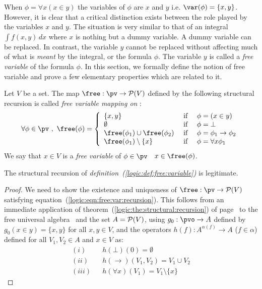 When $\phi=\forall x(x\in y)$ the variables of $\phi$ are $x$ and
$y$ i.e. $\var(\phi)=\{x,y\}$. However, it is clear that a critical
distinction exists between the role played by the variables $x$ and
$y$. The situation is very similar to that of an integral $\int\!
f(x,y)\,dx$ where $x$ is nothing but a dummy variable. A dummy
variable can be replaced. In contrast, the variable $y$ cannot be
replaced without affecting much of what is {\em meant} by the
integral, or the formula $\phi$. The variable $y$ is called a {\em
free variable} of the formula $\phi$. In this section, we formally
define the notion of free variable and prove a few elementary
properties which are related to it.

\begin{defin}\label{logic:def:free:variable}
Let $V$ be a set. The map $\free:\pv\to {\cal P}(V)$ defined by the
following structural recursion is called {\em free variable mapping
on \pv}:
 \begin{equation}\label{logic:eqn:free:var:recursion}
    \forall\phi\in\pv\ ,\ \free(\phi)=\left\{
                    \begin{array}{lcl}
                    \{x,y\}&\mbox{\ if\ }&\phi=(x\in y)\\
                    \emptyset&\mbox{\ if\ }&\phi=\bot\\
                    \free(\phi_{1})\cup\free(\phi_{2}) &\mbox{\ if\ }&\phi=\phi_{1}\to\phi_{2}\\
                    \free(\phi_{1})\setminus\{x\}&\mbox{\ if\ }&\phi=\forall x\phi_{1}
                    \end{array}\right.
    \end{equation}
We say that $x\in V$ is a {\em free variable} of $\phi\in\pv$ \ifand\ $x\in\free(\phi)$.
\end{defin}
\begin{prop}\label{logic:prop:free:variable}
The structural recursion of {\em
definition~(\ref{logic:def:free:variable})} is legitimate.
\end{prop}
\begin{proof}
We need to show the existence and uniqueness of $\free:\pv\to{\cal
P}(V)$ satisfying equation~(\ref{logic:eqn:free:var:recursion}).
This follows from an immediate application of
theorem~(\ref{logic:the:structural:recursion}) of
page~\pageref{logic:the:structural:recursion} to the free universal
algebra \pv\ and the set $A={\cal P}(V)$, using $g_{0}:\pvo\to A$
defined by $g_{0}(x\in y)=\{x,y\}$ for all $x,y\in V$, and the
operators $h(f):A^{\alpha(f)}\to A$ ($f\in\alpha$) defined for all
$V_{1},V_{2}\in A$ and $x\in V$ as:
    \begin{eqnarray*}
    (i)&&h(\bot)(0)=\emptyset\\
    (ii)&&h(\to)(V_{1},V_{2})=V_{1}\cup V_{2}\\
    (iii)&&h(\forall x)(V_{1})=V_{1}\setminus\{x\}
    \end{eqnarray*}
\end{proof}

